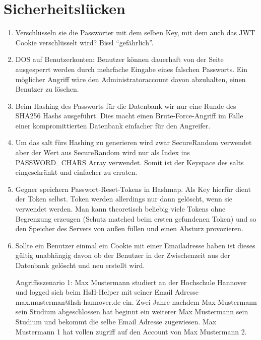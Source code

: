 \documentclass[12pt,DIV14,BCOR10mm,a4paper,parskip=half-,headsepline,headinclude,english,ngerman,bibliography=totocnumbered]{scrreprt}
\begin{document}
\begin{enumerate}
\begin{enumerate}
\end{enumerate}

\chapter{Sicherheitslücken}

\begin{enumerate}
  \item Verschlüsseln sie die Passwörter mit dem selben Key, mit dem auch das JWT Cookie verschlüsselt wird? Bissl \enquote{gefährlich}.
  \item DOS auf Benutzerkonten: Benutzer können dauerhaft von der Seite ausgesperrt werden durch mehrfache Eingabe eines falschen Passworts. Ein möglicher Angriff wäre den Administratoraccount davon abzuhalten, einen Benutzer zu löschen.
  \item Beim Hashing des Passworts für die Datenbank wir nur eine Runde des SHA256 Hashs ausgeführt. Dies macht einen Brute-Force-Angriff im Falle einer kompromittierten Datenbank einfacher für den Angreifer.
  \item Um das salt fürs Hashing zu generieren wird zwar SecureRandom verwendet aber der Wert aus SecureRandom wird nur als Index ins PASSWORD\_CHARS Array verwendet. Somit ist der Keyspace des salts eingeschränkt und einfacher zu erraten.
  \item Gegner speichern Passwort-Reset-Tokens in Hashmap. Als Key hierfür dient der Token selbst. Token werden allerdings nur dann gelöscht, wenn sie verwendet werden. Man kann theoretisch beliebig viele Tokens ohne Begrenzung erzeugen (Schutz matched beim ersten gefundenen Token) und so den Speicher des Servers von außen füllen und einen Absturz provozieren.
  
  \item Sollte ein Benutzer einmal ein Cookie mit einer Emailadresse haben ist dieses gültig unabhängig davon ob der Benutzer in der Zwischenzeit aus der Datenbank gelöscht und neu erstellt wird. 

Angriffsszenario 1: Max Mustermann studiert an der Hochschule Hannover und logged sich beim HsH-Helper mit seiner Email Adresse max.musterman@hsh-hannover.de ein. Zwei Jahre nachdem Max Mustermann sein Studium abgeschlossen hat beginnt ein weiterer Max Mustermann sein Studium und bekommt die selbe Email Adresse zugewiesen. Max Mustermann 1 hat vollen zugriff auf den Account von Max Mustermann 2. 


\end{enumerate}
\end{enumerate}
\end{document}
